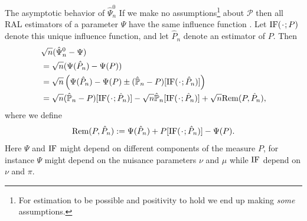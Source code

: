 \documentclass[handout]{beamer}\usepackage{listings}
\begin{document}
\begin{frame}[label={sec:orgc7c85b0}]{The asymptotic behavior of \(\hat\Psi_n^0\)}
\small If we make no assumptions\footnote{For estimation to be possible and positivity to hold we end up making \emph{some} assumptions.} about \(\mathcal{P}\) then all RAL estimators of a parameter
\(\Psi\) have the same influence function \citep{kennedy2016semiparametric}. Let \(\ic(\blank;P)\) denote this
unique influence function, and let \(\hat P_n\) denote an estimator of \(P\). Then
\begin{align*}
  & \sqrt{n}(\hat{\Psi}_n^0 - \Psi)
  \\
  & = \sqrt{n}
    (\Psi(\hat P_n) - \Psi(P))
  \\
  &  = \sqrt{n}
    \left(
    \Psi(\hat P_n) - \Psi(P)
    \pm
    (\empmeas-P)[\ic(\blank; \hat P_n)]
    \right)
  \\
  &  = \sqrt{n}(\empmeas-P)[\ic(\blank; \hat P_n)]
    - \sqrt{n}\empmeas[\ic(\blank; \hat P_n)]
    + \sqrt{n}\mathrm{Rem}(P,  \hat P_n),
\end{align*}
where we define
\begin{equation*}
  \mathrm{Rem}(P,  \hat{P}_n)
  := \Psi(\hat P_n) 
  + P[\ic(\blank; \hat P_n)]
  - \Psi(P).
\end{equation*}
Here \(\Psi\) and \(\mathrm{IF}\) might depend on different components of the measure \(P\), for instance \(\Psi\)
might depend on the nuisance parameters \(\nu\) and \(\mu\) while \(\mathrm{IF}\) depend on \(\nu\) and \(\pi\).
\end{frame}
\end{document}

